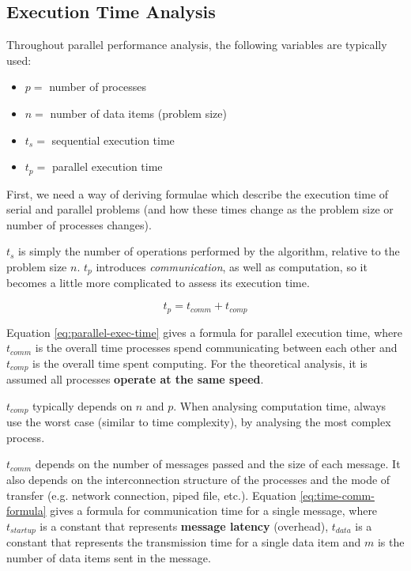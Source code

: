 \documentclass{article}
\begin{document}
\subsection{Execution Time Analysis}
\label{sec:exec-time-analysis}

Throughout parallel performance analysis, the following variables are typically used:
\begin{itemize}
	\item $p= $ number of processes
	\item $n= $ number of data items (problem size)
	\item $t_s= $ sequential execution time
	\item $t_p= $ parallel execution time
\end{itemize}

First, we need a way of deriving formulae which describe the execution time of serial and parallel problems (and how these times change as the problem size or number of processes changes).

$t_s$ is simply the number of operations performed by the algorithm, relative to the problem size $n$. $t_p$ introduces \textit{communication}, as well as computation, so it becomes a little more complicated to assess its execution time.

\begin{equation}
	t_p = t_{comm} + t_{comp}
	\label{eq:parallel-exec-time}
\end{equation}

Equation \ref{eq:parallel-exec-time} gives a formula for parallel execution time, where $t_{comm}$ is the overall time processes spend communicating between each other and $t_{comp}$ is the overall time spent computing. For the theoretical analysis, it is assumed all processes \textbf{operate at the same speed}.

$t_{comp}$ typically depends on $n$ and $p$. When analysing computation time, always use the worst case (similar to time complexity), by analysing the most complex process.

$t_{comm}$ depends on the number of messages passed and the size of each message. It also depends on the interconnection structure of the processes and the mode of transfer (e.g. network connection, piped file, etc.). Equation \ref{eq:time-comm-formula} gives a formula for communication time for a single message, where $t_{startup}$ is a constant that represents \textbf{message latency} (overhead), $t_{data}$ is a constant that represents the transmission time for a single data item and $m$ is the number of data items sent in the message.
\end{document}

